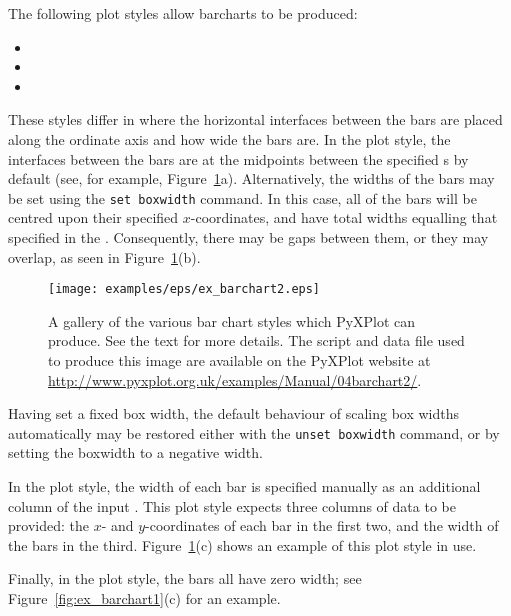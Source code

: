 The following plot styles allow barcharts to be produced:

\begin{itemize}
\item {}
\item {}
\item {}
\end{itemize}

\noindent These styles differ in where the horizontal interfaces between the
bars are placed along the ordinate axis and how wide the bars are.  In the
 plot style, the interfaces between the bars are at the midpoints
between the specified \datapoint s by default (see, for example,
Figure~\ref{fig:ex_barchart2}a).  Alternatively, the widths of the bars may be
set using the {\tt set boxwidth} command. In this case, all of the bars will be
centred upon their specified $x$-coordinates, and have total widths equalling
that specified in the . Consequently, there may be gaps
between them, or they may overlap, as seen in Figure~\ref{fig:ex_barchart2}(b).

\begin{figure}
\begin{center}
\texttt{[image: examples/eps/ex\_barchart2.eps]}
\end{center}
\caption[A gallery of the various bar chart styles which PyXPlot can produce]
{A gallery of the various bar chart styles which PyXPlot can produce.
See the text for more details.  The script and data file used to produce this
image are available on the PyXPlot website at
\protect\url{http://www.pyxplot.org.uk/examples/Manual/04barchart2/}.}
\label{fig:ex_barchart2}
\end{figure}

Having set a fixed box width, the default behaviour of scaling box widths
automatically may be restored either with the {\tt unset boxwidth} command,
or by setting the boxwidth to a negative width.

In the  plot style, the width of each bar is specified manually
as an additional column of the input \datafile.  This plot style expects three
columns of data to be provided: the $x$- and $y$-coordinates of each bar in the
first two, and the width of the bars in the third.
Figure~\ref{fig:ex_barchart2}(c) shows an example of this plot style in use.

Finally, in the  plot style, the bars all have zero width; see
Figure~\ref{fig:ex_barchart1}(c) for an example.

